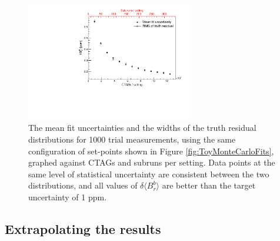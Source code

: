 \begin{figure}[t!]
\centering{}
\includegraphics[trim={0cm 0cm 0cm 0cm},clip,width=0.65\textwidth]{Images/Chapter4/BrErr_and_BrResRMS_overlay.pdf}
\caption{The mean fit uncertainties and the widths of the truth residual distributions for 1000 trial measurements, using the same configuration of set-points shown in Figure \ref{fig:ToyMonteCarloFits}, graphed against CTAGs and subruns per setting. Data points at the same level of statistical uncertainty are consistent between the two distributions, and all values of $\delta \langle B_{r}^{b} \rangle$ are better than the target uncertainty of 1 ppm.}
\label{fig:BrErr_and_BrResRMS}
\end{figure}

\subsection{Extrapolating the results}

